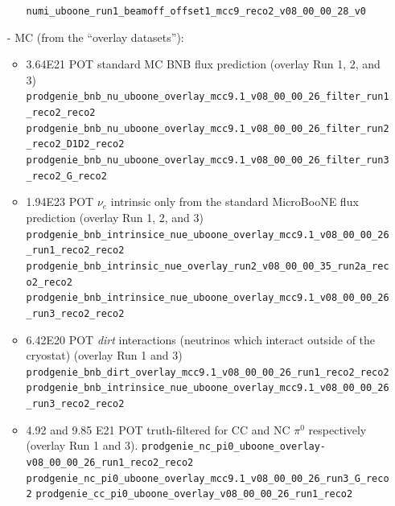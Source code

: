 \begin{itemize}
\begin{itemize}
\newline
\texttt{numi\_uboone\_run1\_beamoff\_offset1\_mcc9\_reco2\_v08\_00\_00\_28\_v0}
\end{itemize}
\item[-] MC (from the ``overlay datasets''):
\begin{itemize}
\item 3.64E21 POT standard MC BNB flux prediction (overlay Run 1, 2, and 3) \newline
\texttt{prodgenie\_bnb\_nu\_uboone\_overlay\_mcc9.1\_v08\_00\_00\_26\_filter\_run1\_reco2\_reco2} \newline
\texttt{prodgenie\_bnb\_nu\_uboone\_overlay\_mcc9.1\_v08\_00\_00\_26\_filter\_run2\_reco2\_D1D2\_reco2} \newline
\texttt{prodgenie\_bnb\_nu\_uboone\_overlay\_mcc9.1\_v08\_00\_00\_26\_filter\_run3\_reco2\_G\_reco2} \newline
\item 1.94E23 POT $\nu_e$ intrinsic only from the standard MicroBooNE flux prediction (overlay Run 1, 2, and 3) \newline
\texttt{prodgenie\_bnb\_intrinsice\_nue\_uboone\_overlay\_mcc9.1\_v08\_00\_00\_26\_run1\_reco2\_reco2} \newline
\texttt{prodgenie\_bnb\_intrinsic\_nue\_overlay\_run2\_v08\_00\_00\_35\_run2a\_reco2\_reco2} \newline
\texttt{prodgenie\_bnb\_intrinsice\_nue\_uboone\_overlay\_mcc9.1\_v08\_00\_00\_26\_run3\_reco2\_reco2} \newline
\item 6.42E20 POT  \emph{dirt} interactions (neutrinos which interact outside of the cryostat) (overlay Run 1 and 3) \newline
\texttt{prodgenie\_bnb\_dirt\_overlay\_mcc9.1\_v08\_00\_00\_26\_run1\_reco2\_reco2} \newline
\texttt{prodgenie\_bnb\_intrinsice\_nue\_uboone\_overlay\_mcc9.1\_v08\_00\_00\_26\_run3\_reco2\_reco2} \newline
\item 4.92 and 9.85 E21 POT truth-filtered for CC and NC $\pi^0$ respectively (overlay Run 1 and 3). \newline
\texttt{prodgenie\_nc\_pi0\_uboone\_overlay-v08\_00\_00\_26\_run1\_reco2\_reco2}\newline
\texttt{prodgenie\_nc\_pi0\_uboone\_overlay\_mcc9.1\_v08\_00\_00\_26\_run3\_G\_reco2}\newline
\texttt{prodgenie\_cc\_pi0\_uboone\_overlay\_v08\_00\_00\_26\_run1\_reco2}\newline

\end{itemize}
\end{itemize}
